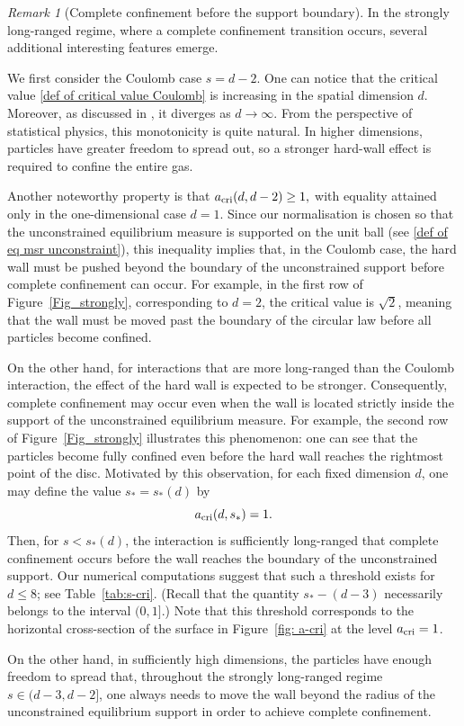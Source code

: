 \documentclass{amsart}
\theoremstyle{plain}
\theoremstyle{remark}
\newtheorem{rem}{Remark}%
\numberwithin{equation}{section}
\begin{document}
\begin{rem}[Complete confinement before the support boundary] \label{Rem_support bdy}
In the strongly long-ranged regime, where a complete confinement transition occurs, several additional interesting features emerge.

We first consider the Coulomb case $s=d-2$. One can notice that the critical value \eqref{def of critical value Coulomb} is increasing in the spatial dimension \(d\). Moreover, as discussed in \cite[Remark~12]{BFMS26}, it diverges as $d\to\infty$. From the perspective of statistical physics, this monotonicity is quite natural. In higher dimensions, particles have greater freedom to spread out, so a stronger hard-wall effect is required to confine the entire gas.

Another noteworthy property is that $a_{\rm cri}(d,d-2)\ge1,$ with equality attained only in the one-dimensional case $d=1$. Since our normalisation is chosen so that the unconstrained equilibrium measure is supported on the unit ball (see \eqref{def of eq msr unconstraint}), this inequality implies that, in the Coulomb case, the hard wall must be pushed beyond the boundary of the unconstrained support before complete confinement can occur. For example, in the first row of Figure~\ref{Fig_strongly}, corresponding to $d=2$, the critical value is $\sqrt{2}$, meaning that the wall must be moved past the boundary of the circular law before all particles become confined.

On the other hand, for interactions that are more long-ranged than the Coulomb interaction, the effect of the hard wall is expected to be stronger. Consequently, complete confinement may occur even when the wall is located strictly inside the support of the unconstrained equilibrium measure. For example, the second row of Figure~\ref{Fig_strongly} illustrates this phenomenon: one can see that the particles become fully confined even before the hard wall reaches the rightmost point of the disc. 
Motivated by this observation, for each fixed dimension $d$, one may define the value $s_*=s_*(d)$ by
\begin{equation}
a_{\rm cri}(d, s_*)=1.
\end{equation}
Then, for $s<s_*(d)$, the interaction is sufficiently long-ranged that complete confinement occurs before the wall reaches the boundary of the unconstrained support. Our numerical computations suggest that such a threshold exists for $d\le8$; see Table~\ref{tab:s-cri}. (Recall that the quantity $s_*-(d-3)$ necessarily belongs to the interval $(0,1]$.) Note that this threshold corresponds to the horizontal cross-section of the surface in Figure~\ref{fig: a-cri} at the level $a_{\rm cri}=1$.

On the other hand, in sufficiently high dimensions, the particles have enough freedom to spread that, throughout the strongly long-ranged regime $s\in(d-3,d-2]$, one always needs to move the wall beyond the radius of the unconstrained equilibrium support in order to achieve complete confinement.
\end{rem}
\end{document}
